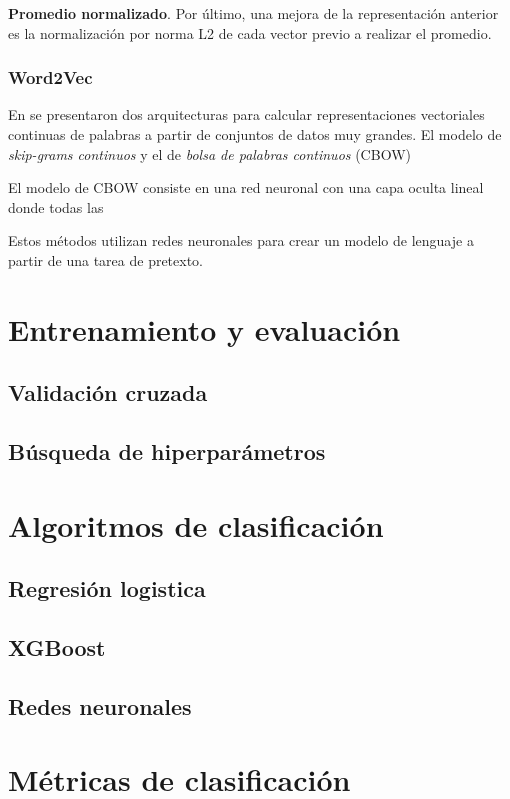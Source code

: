 \textbf{Promedio normalizado}. Por último, una mejora de la representación
anterior es la normalización por norma L2 de cada vector previo a realizar el
promedio.

\subsubsection{Word2Vec}

En \citep{Mikolov-Ilya-Kai-Greg-Jeffrey-2013} se presentaron dos arquitecturas
para calcular representaciones vectoriales continuas de palabras a partir de
conjuntos de datos muy grandes. El modelo de \emph{skip-grams continuos} y el de
\emph{bolsa de palabras continuos} (CBOW)

El modelo de CBOW consiste en una red neuronal con una capa oculta lineal
donde todas las

Estos métodos utilizan redes neuronales para crear un modelo de lenguaje a
partir de una tarea de pretexto. 

\section{Entrenamiento y evaluación}

\subsection{Validación cruzada}

\subsection{Búsqueda de hiperparámetros}

\section{Algoritmos de clasificación}

\subsection{Regresión logistica}

\subsection{XGBoost}

\subsection{Redes neuronales}

\section{Métricas de clasificación}